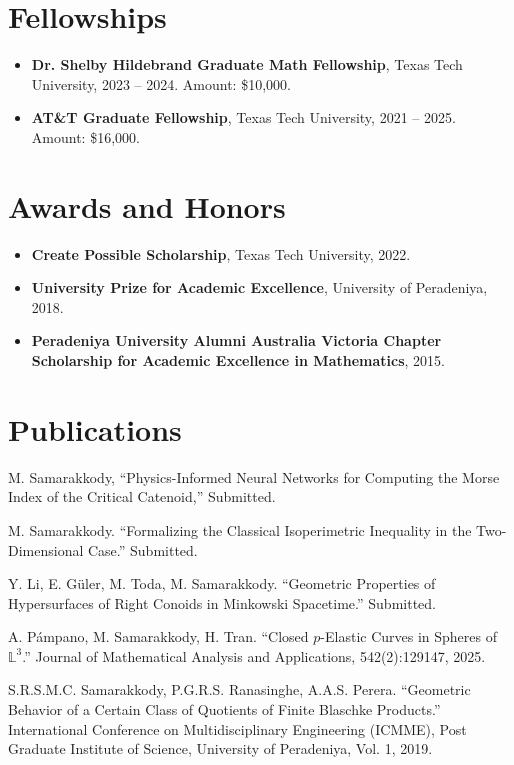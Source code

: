 \documentclass[11pt]{article}
\begin{document}
\section*{Fellowships}

\begin{itemize}
	\item \textbf{Dr. Shelby Hildebrand Graduate Math Fellowship}, Texas Tech University, 2023 -- 2024. Amount: \$10,000.
	\item \textbf{AT\&T Graduate Fellowship}, Texas Tech University, 2021 -- 2025. Amount: \$16,000.
\end{itemize}

\section*{Awards and Honors}

\begin{itemize}
	\item \textbf{Create Possible Scholarship}, Texas Tech University, 2022.
	\item \textbf{University Prize for Academic Excellence}, University of Peradeniya, 2018.
	\item \textbf{Peradeniya University Alumni Australia Victoria Chapter Scholarship for Academic Excellence in Mathematics}, 2015.
\end{itemize}

\section*{Publications}

\begin{etaremune}
	\item M. Samarakkody, ``Physics-Informed Neural Networks for Computing the Morse Index of the Critical Catenoid,'' Submitted.
	\item M. Samarakkody. ``Formalizing the Classical Isoperimetric Inequality in the Two-Dimensional Case.'' Submitted.
	\item Y. Li, E. G\"uler, M. Toda, M. Samarakkody. ``Geometric Properties of Hypersurfaces of Right Conoids in Minkowski Spacetime.'' Submitted.
	\item A. P\'ampano, M. Samarakkody, H. Tran. ``Closed $p$-Elastic Curves in Spheres of $\mathbb{L}^{3}$.'' Journal of Mathematical Analysis and Applications, 542(2):129147, 2025.
	\item S.R.S.M.C. Samarakkody, P.G.R.S. Ranasinghe, A.A.S. Perera. ``Geometric Behavior of a Certain Class of Quotients of Finite Blaschke Products.'' International Conference on Multidisciplinary Engineering (ICMME), Post Graduate Institute of Science, University of Peradeniya, Vol. 1, 2019.
\end{etaremune}
\end{document}
